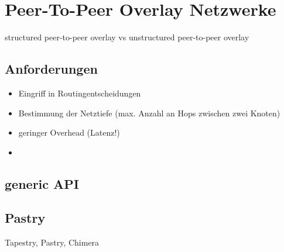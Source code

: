
\section{Peer-To-Peer Overlay Netzwerke}
structured peer-to-peer overlay vs unstructured peer-to-peer overlay

\subsection{Anforderungen}
\begin{itemize}
\item Eingriff in Routingentscheidungen
\item Bestimmung der Netztiefe (max. Anzahl an Hops zwischen zwei Knoten)
\item geringer Overhead (Latenz!)
\item 
\end{itemize}

\subsection{generic API}
\cite{citeulike:6643572} %

\subsection{Pastry}
\cite{citeulike:780210} %
Tapestry, Pastry, Chimera
